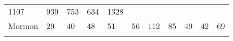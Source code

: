 \documentclass[]{article}
\begin{document}
\begin{longtable}[]{@{}lllllllllll@{}}
\begin{minipage}[t]{0.05\columnwidth}
1107\strut
\end{minipage} & \begin{minipage}[t]{0.06\columnwidth}\raggedright\strut
939\strut
\end{minipage} & \begin{minipage}[t]{0.06\columnwidth}\raggedright\strut
753\strut
\end{minipage} & \begin{minipage}[t]{0.04\columnwidth}\raggedright\strut
634\strut
\end{minipage} & \begin{minipage}[t]{0.11\columnwidth}\raggedright\strut
1328\strut
\end{minipage}\tabularnewline
\begin{minipage}[t]{0.14\columnwidth}\raggedright\strut
Mormon\strut
\end{minipage} & \begin{minipage}[t]{0.04\columnwidth}\raggedright\strut
29\strut
\end{minipage} & \begin{minipage}[t]{0.05\columnwidth}\raggedright\strut
40\strut
\end{minipage} & \begin{minipage}[t]{0.05\columnwidth}\raggedright\strut
48\strut
\end{minipage} & \begin{minipage}[t]{0.05\columnwidth}\raggedright\strut
51\strut
\end{minipage} & \begin{minipage}[t]{0.05\columnwidth}\raggedright\strut
56\strut
\end{minipage} & \begin{minipage}[t]{0.05\columnwidth}\raggedright\strut
112\strut
\end{minipage} & \begin{minipage}[t]{0.06\columnwidth}\raggedright\strut
85\strut
\end{minipage} & \begin{minipage}[t]{0.06\columnwidth}\raggedright\strut
49\strut
\end{minipage} & \begin{minipage}[t]{0.04\columnwidth}\raggedright\strut
42\strut
\end{minipage} & \begin{minipage}[t]{0.11\columnwidth}\raggedright\strut
69\strut
\end{minipage}\tabularnewline
\begin{minipage}[t]{0.14\columnwidth}\raggedright\strut

\end{minipage}
\end{longtable}
\end{document}
